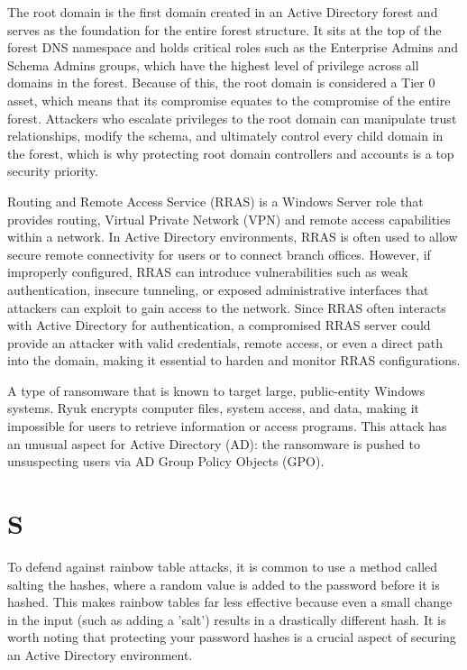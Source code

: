  The root domain is the first domain created in an Active Directory forest and serves as the foundation for the entire forest structure. It sits at the top of the forest DNS namespace and holds critical roles such as the Enterprise Admins and Schema Admins groups, which have the highest level of privilege across all domains in the forest. Because of this, the root domain is considered a Tier 0 asset, which means that its compromise equates to the compromise of the entire forest. Attackers who escalate privileges to the root domain can manipulate trust relationships, modify the schema, and ultimately control every child domain in the forest, which is why protecting root domain controllers and accounts is a top security priority.

 Routing and Remote Access Service (RRAS) is a Windows Server role that provides routing, Virtual Private Network (VPN) and remote access capabilities within a network. In Active Directory environments, RRAS is often used to allow secure remote connectivity for users or to connect branch offices. However, if improperly configured, RRAS can introduce vulnerabilities such as weak authentication, insecure tunneling, or exposed administrative interfaces that attackers can exploit to gain access to the network. Since RRAS often interacts with Active Directory for authentication, a compromised RRAS server could provide an attacker with valid credentials, remote access, or even a direct path into the domain, making it essential to harden and monitor RRAS configurations.

 A type of ransomware that is known to target large, public-entity Windows systems. Ryuk encrypts computer files, system access, and data, making it impossible for users to retrieve information or access programs. This attack has an unusual aspect for Active Directory (AD): the ransomware is pushed to unsuspecting users via AD Group Policy Objects (GPO).

\section*{S}
 To defend against rainbow table attacks, it is common to use a method called salting the hashes, where a random value is added to the password before it is hashed. This makes rainbow tables far less effective because even a small change in the input (such as adding a 'salt') results in a drastically different hash. It is worth noting that protecting your password hashes is a crucial aspect of securing an Active Directory environment.

